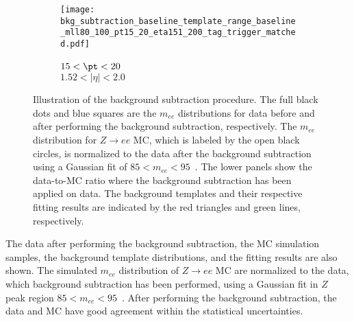 \begin{figure}[htbp]
\begin{subfigure}[b]{0.32\textwidth}
    \end{subfigure}
    \begin{subfigure}[b]{0.32\textwidth}
        \begin{center}
            \texttt{[image: bkg\_subtraction\_baseline\_template\_range\_baseline\_mll80\_100\_pt15\_20\_eta151\_200\_tag\_trigger\_matched.pdf]}
            \caption{$15 < \pt < 20$~{\GeV}\\$1.52<|\eta|<2.0$}
        \end{center}
    \end{subfigure}
    \caption{Illustration of the background subtraction procedure.
    The full black dots and blue squares are the $m_{ee}$ distributions for data before and after performing the background subtraction, respectively.
    The $m_{ee}$ distribution for $Z \to ee$ MC, which is labeled by the open black circles, is normalized to the data after the background subtraction using a Gaussian fit of $85 < m_{ee} < 95$~{\GeV}.
    The lower panels show the data-to-MC ratio where the background subtraction has been applied on data.
    The background templates and their respective fitting results are indicated by the red triangles and green lines, respectively.
    }
    \label{fig:app_RLE_bkg_estimations}
\end{figure}
%
The data after performing the background subtraction, the MC simulation samples, the background template distributions, and the fitting results are also shown.
The simulated $m_{ee}$ distribution of $Z \to ee$ MC are normalized to the data, which background subtraction has been performed, using a Gaussian fit in $Z$ peak region $85 < m_{ee} < 95$~{\GeV}.
After performing the background subtraction, the data and MC have good agreement within the statistical uncertainties.

